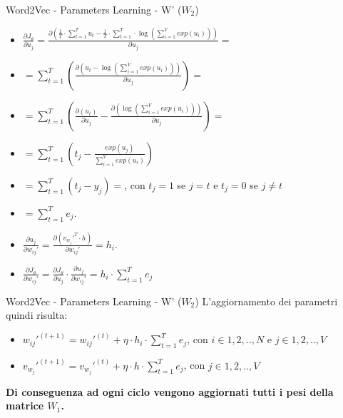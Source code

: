 \documentclass[british]{beamer}
\begin{document}
\begin{frame}{Word2Vec - Parameters Learning - W' (\(W_2\))}
	\begin{itemize}
		\item \( \frac{\partial J_{\theta}}{\partial u_j} = \frac{\partial \left( \frac{1}{T} \cdot \sum_{t=1}^{T} u_t - \frac{1}{T} \cdot \sum_{t=1}^{T} \cdot \log \left( \sum_{i=1}^{V} exp(u_i) \right)\right)}{\partial u_j}  = \)
		\item \( = \sum_{t=1}^{T} \left( \frac{\partial \left( u_t - \log \left( \sum_{i=1}^{V} exp(u_i) \right)\right)}{\partial u_j} \right)=\)
		\item \( = \sum_{t=1}^{T} \left( \frac{\partial \left( u_t\right)}{\partial u_j} -\frac{\partial \left(\log \left( \sum_{i=1}^{V} exp(u_i) \right)\right)}{\partial u_j} \right)=\)
		\item \( = \sum_{t=1}^{T} \left( t_j - \frac{exp(u_j)}{\sum_{i=1}^{V} exp(u_i)} \right)\)
		\item \( = \sum_{t=1}^{T} \left( t_j - y_j \right) = \), con \(t_j = 1\) se \(j=t\) e \(t_j = 0\) se \(j\neq t\)
		\item \( = \sum_{t=1}^{T} e_j \).
		\item \(\frac{\partial u_j}{\partial w_{ij}'} = \frac{\partial \left( v_{w_j}'^T \cdot h\right)}{\partial w_{ij}'} = h_i\).
		\item  \( \frac{\partial J_{\theta}}{\partial w_{ij}'} = \frac{\partial J_{\theta}}{\partial u_j} \cdot \frac{\partial u_j}{\partial w_{ij}'} = h_i \cdot \sum_{t=1}^{T} e_j\)
	\end{itemize}
\end{frame}

\begin{frame}{Word2Vec - Parameters Learning - W' (\(W_2\))}
	L'aggiornamento dei parametri quindi risulta:
	\begin{itemize}
		\item \( w_{ij}'^{(t+1)} = w_{ij}'^{(t)} + \eta\cdot h_i \cdot \sum_{t=1}^{T} e_j\), con \(i \in {1,2,..,N}\) e \(j \in {1,2,..,V}\)
		\item \( v_{w_{j}}'^{(t+1)} = v_{w_{j}}'^{(t)} + \eta\cdot h \cdot \sum_{t=1}^{T} e_j\), con \(j \in {1,2,..,V}\)
	\end{itemize}
	\textbf{Di conseguenza ad ogni ciclo vengono aggiornati tutti i pesi della matrice \(W_1\).}
\end{frame}
\end{document}
